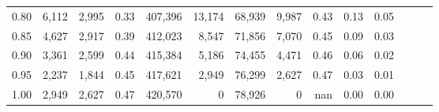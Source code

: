 \begin{tabular}{rrrrrrrrrrrrrr}
0.80 &   6,112 &   2,995 &  0.33 &  407,396 &   13,174 &  68,939 &   9,987 &  0.43 &  0.13 &      0.05 \\
0.85 &   4,627 &   2,917 &  0.39 &  412,023 &    8,547 &  71,856 &   7,070 &  0.45 &  0.09 &      0.03 \\
0.90 &   3,361 &   2,599 &  0.44 &  415,384 &    5,186 &  74,455 &   4,471 &  0.46 &  0.06 &      0.02 \\
0.95 &   2,237 &   1,844 &  0.45 &  417,621 &    2,949 &  76,299 &   2,627 &  0.47 &  0.03 &      0.01 \\
1.00 &   2,949 &   2,627 &  0.47 &  420,570 &        0 &  78,926 &       0 &   nan &  0.00 &      0.00 \\
\bottomrule
\end{tabular}
